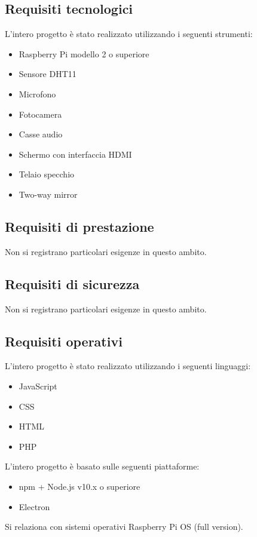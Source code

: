 \documentclass[a4paper,11pt]{article}       %
\begin{document}
    \subsection{Requisiti tecnologici}
        L'intero progetto è stato realizzato utilizzando i seguenti strumenti:
        \begin{itemize}
            \item Raspberry Pi modello 2 o superiore
            \item Sensore DHT11
            \item Microfono
            \item Fotocamera
            \item Casse audio
            \item Schermo con interfaccia HDMI
            \item Telaio specchio
            \item \gls{Two-way mirror}
        \end{itemize}
        
    \subsection{Requisiti di prestazione}
        Non si registrano particolari esigenze in questo ambito.
    
    \subsection{Requisiti di sicurezza}
        Non si registrano particolari esigenze in questo ambito.
    
    \subsection{Requisiti operativi}
        L'intero progetto è stato realizzato utilizzando i seguenti linguaggi:
        \begin{itemize}
            \item JavaScript
            \item CSS
            \item HTML
            \item PHP
        \end{itemize}
        L'intero progetto è basato sulle seguenti piattaforme:
        \begin{itemize}
            \item npm + Node.js v10.x o superiore
            \item Electron
        \end{itemize}
        Si relaziona con sistemi operativi Raspberry Pi OS (full version).
    
\end{document}
